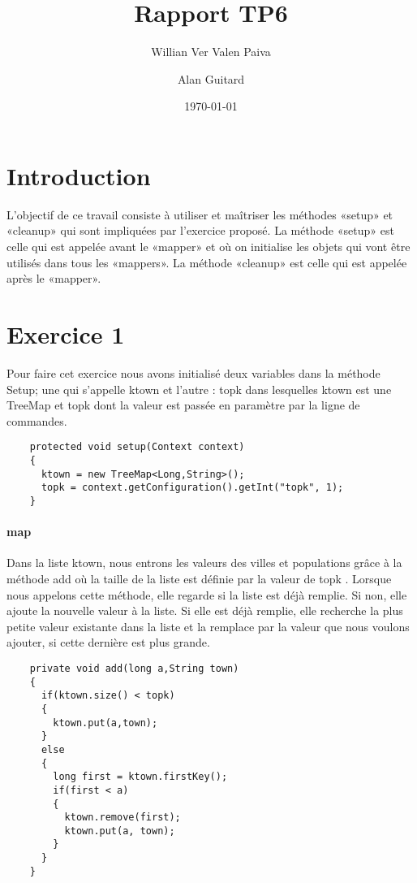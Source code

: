 \documentclass[a4paper]{article}
\author{Willian Ver Valen Paiva \and Alan Guitard}
\date{\today}
\title{Rapport TP6}
\begin{document}
\maketitle

\tableofcontents

\newpage
\section{Introduction}
L’objectif de ce travail consiste à utiliser et maîtriser les méthodes «setup» et
«cleanup» qui sont impliquées	par l’exercice proposé.
La méthode «setup» est celle qui est appelée avant le «mapper» et où on initialise les
objets qui vont être utilisés dans tous les	«mappers».
La méthode «cleanup» est celle qui est appelée après le «mapper».
\section{Exercice 1}
Pour faire cet exercice nous avons initialisé deux variables dans la méthode Setup; une
qui	s’appelle ktown et l’autre : topk dans lesquelles ktown est une TreeMap et topk dont
la valeur est passée en paramètre par la ligne de commandes.

\begin{lstlisting}
    protected void setup(Context context)
    {
      ktown = new TreeMap<Long,String>();
      topk = context.getConfiguration().getInt("topk", 1);
    }
\end{lstlisting}
\paragraph{map}
Dans	la	liste	 ktown,	 nous	entrons	les	valeurs	des	villes	et	populations	grâce	à	la	méthode
add	 où	la	taille	de	la	liste	est	définie	par	la	valeur	de	topk	.	 Lorsque	nous	appelons	cette
méthode,	elle	regarde	si	la	liste	est	déjà	remplie.	Si	 non,	 elle	ajoute	la	nouvelle	valeur	à	la
liste.	 Si	 elle	 est	 déjà	 remplie,	 elle	 recherche	 la	 plus	 petite	 valeur	 existante	 dans	 la	 liste	 et
la remplace	par	la	valeur	que	nous	voulons	ajouter,	si	cette	dernière	est	plus	grande.

\begin{lstlisting}
    private void add(long a,String town)
    {
      if(ktown.size() < topk)
      {
        ktown.put(a,town);
      }
      else
      {
        long first = ktown.firstKey();
        if(first < a)
        {
          ktown.remove(first);
          ktown.put(a, town);
        }
      }
    }
\end{lstlisting}
\end{document}

